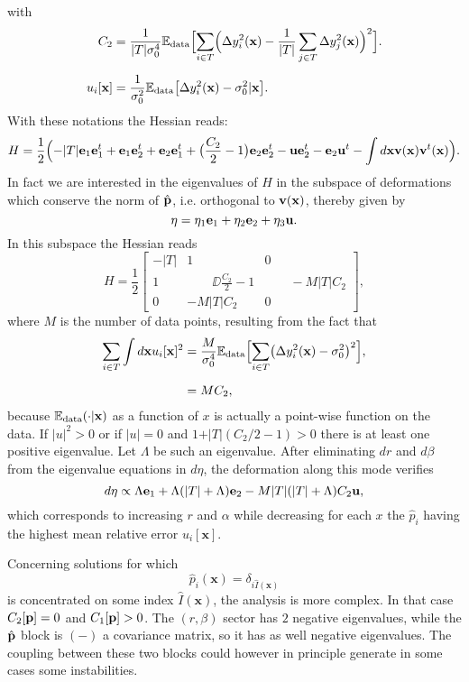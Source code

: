 with
\begin{align*}
C_2 &= \frac{1}{\vert  T\vert\sigma_0^4}{\mathbb E}_{\rm data}\Bigl[\sum_{i\in  T} \Bigl(\Delta y_i^2(\mathbf{x})-\frac{1}{\vert  T\vert}\sum_{j\in  T}\Delta y_j^2(\mathbf{x})\Bigr)^2\Bigr].\\[0.2cm]
u_i[\mathbf{x}] &= \frac{1}{\sigma_0^2}{\mathbb E}_{\rm data}
\bigl[\Delta y_i^2(\mathbf{x})-\sigma_0^2\vert \mathbf{x} \bigr].
\end{align*}
With these notations the Hessian reads: 
\[
H = \frac{1}{2}\Bigl(-\vert  T\vert{\bf e}_1{\bf e}_1^t+{\bf e}_1{\bf e}_2^t+{\bf e}_2{\bf e}_1^t+\bigl(\frac{C_2}{2}-1\bigr){\bf e}_2{\bf e}_2^t
-{\bf u}{\bf e}_2^t-{\bf e}_2{\bf u}^t-\int d\mathbf{x}{\bf v}(\mathbf{x}){\bf v}^t(\mathbf{x})\Bigr).
\]
In fact we are interested in the eigenvalues of $H$ in the subspace of deformations
which conserve the norm of $\hat {\bf p}$, i.e. orthogonal to ${\bf v}(\mathbf{x})$, thereby given by
\[
{\bf \eta} = \eta_1{\bf e}_1+\eta_2{\bf e}_2+\eta_3{\bf u}.
\]
In this subspace the Hessian reads
\[
H =\frac{1}{2}
\left[
  \begin{matrix}
 -\vert  T\vert& 1 &0 \\[0.4cm] 
 1 & \qquad\DD \frac{C_2}{2}-1&\qquad-M\vert  T\vert C_2  \\[0.4cm]
 0& - M \vert T\vert C_2 &0 
  \end{matrix}
  \right],
\]
where $M$ is the number of data points,
resulting from the fact that 
\begin{align*}
\sum_{i\in T}\int d\mathbf{x} u_i[\mathbf{x}]^2 &= \frac{M}{\sigma_0^4}{\mathbb E}_{\rm data}
\Bigl[\sum_{i\in T}\bigl(\Delta y_i^2(\mathbf{x})-\sigma_0^2\bigr)^2\Bigr],\\[0.2cm]
&= M C_2,
\end{align*}
because ${\mathbb E}_{\rm data}(\cdot\vert \mathbf{x})$ as a function of $x$ is actually a point-wise function on the data.
If $|u|^2>0$ or  if $|u|=0$ and $1+\vert  T\vert(C_2/2-1)>0$ there is at least one positive eigenvalue. Let $\Lambda$ be such an eigenvalue.
After eliminating $dr$ and $d\beta$ from the eigenvalue equations in $d\eta$, the deformation along this mode verifies
\[
{d\bf \eta} \propto \Lambda{\bf e}_1+\Lambda(\vert T\vert+\Lambda){\bf e}_2-M\vert  T\vert(\vert  T\vert+\Lambda)C_2{\bf u},
\]
which corresponds to increasing $r$ and $\alpha$ while decreasing for each $x$ the $\hat p_i$ having the highest mean relative error $u_i[\mathbf{x}]$.


\noindent Concerning solutions for which
\[
\hat p_i(\mathbf{x}) = \delta_{i\hat I(\mathbf{x})}
\]
is concentrated on some index $\hat I(\mathbf{x})$,  the analysis is more complex. In that case $C_2[{\bf p}]=0$ and $C_1[{\bf p}] >0$. The $(r,\beta)$ sector has $2$ negative eigenvalues,
while the $\hat {\bf p}$ block is $(-)$ a covariance matrix, so it has as well negative eigenvalues. The coupling between these  two blocks could however in principle generate in some cases some instabilities.

